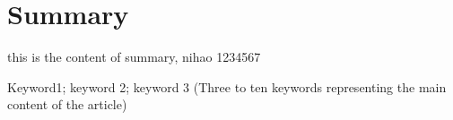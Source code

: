 \thispagestyle{empty}

\section*{Summary}
this is the content of summary, nihao 1234567

\begin{keywords}
Keyword1; keyword 2; keyword 3 (Three to ten keywords representing the main content of the article)
\end{keywords}
